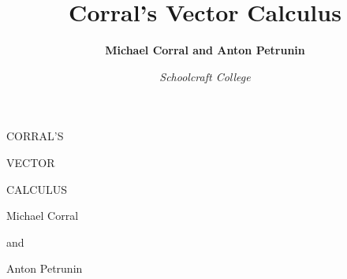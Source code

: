 \documentclass[letterpaper,11pt,titlepage,openany,twoside,numbers=noenddot,bibliography=totoc,index=totoc]{scrbook}
\theoremstyle{definition}
\theoremstyle{itexmp}
\numberwithin{figure}{section}
\begin{document}
\frontmatter
\pagestyle{empty}
\centerline{}
\vspace{10mm}
\centerline{\Huge{CORRAL'S}}
\medskip
\centerline{\Huge{VECTOR}}
\medskip
\centerline{\Huge{CALCULUS}}
\vspace{10mm}
\centerline{\Large{Michael Corral}}
\centerline{\Large{and}}
\centerline{\Large{Anton Petrunin}}
\title{Corral's Vector Calculus}
\author{\textsf{\textbf{Michael Corral and Anton Petrunin}}}
\date{\large \textsf{\textsl{Schoolcraft College}}}
\uppertitleback{\emph{About the author}:\\
Michael Corral is an Adjunct Faculty member of the Department of Mathematics at Schoolcraft College. 
He received a B.A. in Mathematics from the University of California at Berkeley, and received an M.A. in Mathematics and
an M.S. in Industrial \& Operations Engineering from the University of Michigan.\\\\
This text was typeset in \LaTeXe\medspace with the \textsf{KOMA-Script} bundle, using the GNU Emacs text editor on a
Fedora Linux system. The graphics were created using MetaPost, PGF, and Gnuplot.}
\lowertitleback{Copyright \copyright 2016 Anton Petrunin.\\
Permission is granted to copy, distribute and/or modify this document under the terms of the GNU Free Documentation License, Version 1.2 or any later version published by the Free Software Foundation;
with no Invariant Sections, no Front-Cover Texts, and no Back-Cover Texts. 
A copy of the license is included in the section entitled ``GNU Free Documentation License''.}
\maketitle
\pagestyle{fancy}
\renewcommand{\sectionmark}[1]{\markright{\thesection\ #1}}
\renewcommand{\biblnfont}{\textnormal}
\renewcommand{\bibfnfont}{\textnormal}
\renewcommand{\bibtfont}{\textit}
\renewcommand{\bibansep}{, }
\renewcommand{\bibatsep}{,}
\renewcommand{\bibbdsep}{,}
\renewcommand{\qedsymbol}{\textsf{\textbf{\textsc{\footnotesize{QED}}}}}
\fancyhf{}
\fancyhead[LE]{\sffamily\bfseries\thepage}
\fancyhead[CE]{\sffamily\bfseries\leftmark}
\fancyhead[CO]{\sffamily\bfseries\rightmark}
\fancyhead[RO]{\sffamily\bfseries\thepage}
\end{document}

